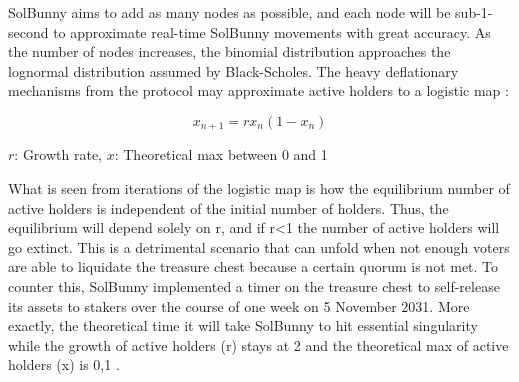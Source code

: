 \documentclass[12pt]{article}
\begin{document}
SolBunny aims to add as many nodes as possible, and each node will be sub-1-second to approximate real-time SolBunny movements with great accuracy. As the number of nodes increases, the binomial distribution approaches the lognormal distribution assumed by Black-Scholes. The heavy deflationary mechanisms from the protocol may approximate active holders to a logistic map \cite{logmap}:

\begin{equation}\label{mm}
x_{n+1} =rx_{n}(1-x_{n})
\end{equation}\label{mm}

$r$: Growth rate, $x$: Theoretical max between 0 and 1

What is seen from iterations of the logistic map is how the equilibrium number of active holders is independent of the initial number of holders. Thus, the equilibrium will depend solely on r, and if r<1 the number of active holders will go extinct. This is a detrimental scenario that can unfold when not enough voters are able to liquidate the treasure chest because a certain quorum is not met. To counter this, SolBunny implemented a timer on the treasure chest to self-release its assets to stakers over the course of one week on 5 November 2031. More exactly, the theoretical time it will take SolBunny to hit essential singularity while the growth of active holders (r) stays at 2 and the theoretical max of active holders (x) is 0,1 \textperthousand.
\end{document}
